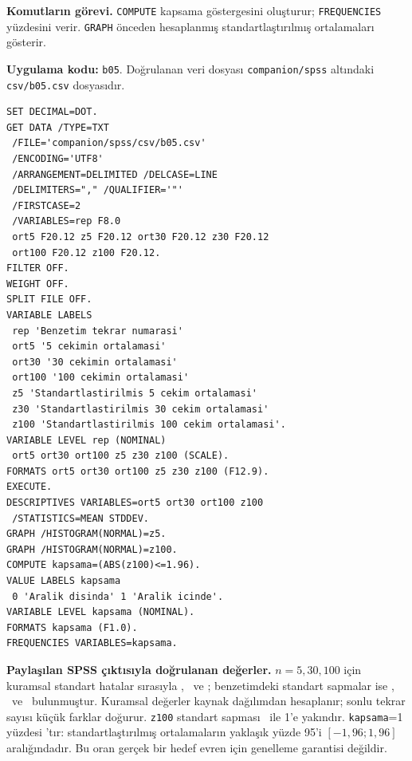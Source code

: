 {\raggedright
\noindent\textbf{Komutların görevi.} \texttt{COMPUTE} kapsama göstergesini oluşturur; \texttt{FREQUENCIES} yüzdesini verir. \texttt{GRAPH} önceden hesaplanmış standartlaştırılmış ortalamaları gösterir.\par}

\textbf{Uygulama kodu:} \texttt{b05}. Doğrulanan veri dosyası
\texttt{companion/spss} altındaki \texttt{csv/b05.csv} dosyasıdır.

\begin{lstlisting}[style=prismSPSS]
SET DECIMAL=DOT.
GET DATA /TYPE=TXT
 /FILE='companion/spss/csv/b05.csv'
 /ENCODING='UTF8'
 /ARRANGEMENT=DELIMITED /DELCASE=LINE
 /DELIMITERS="," /QUALIFIER='"'
 /FIRSTCASE=2
 /VARIABLES=rep F8.0
 ort5 F20.12 z5 F20.12 ort30 F20.12 z30 F20.12
 ort100 F20.12 z100 F20.12.
FILTER OFF.
WEIGHT OFF.
SPLIT FILE OFF.
VARIABLE LABELS
 rep 'Benzetim tekrar numarasi'
 ort5 '5 cekimin ortalamasi'
 ort30 '30 cekimin ortalamasi'
 ort100 '100 cekimin ortalamasi'
 z5 'Standartlastirilmis 5 cekim ortalamasi'
 z30 'Standartlastirilmis 30 cekim ortalamasi'
 z100 'Standartlastirilmis 100 cekim ortalamasi'.
VARIABLE LEVEL rep (NOMINAL)
 ort5 ort30 ort100 z5 z30 z100 (SCALE).
FORMATS ort5 ort30 ort100 z5 z30 z100 (F12.9).
EXECUTE.
DESCRIPTIVES VARIABLES=ort5 ort30 ort100 z100
 /STATISTICS=MEAN STDDEV.
GRAPH /HISTOGRAM(NORMAL)=z5.
GRAPH /HISTOGRAM(NORMAL)=z100.
COMPUTE kapsama=(ABS(z100)<=1.96).
VALUE LABELS kapsama
 0 'Aralik disinda' 1 'Aralik icinde'.
VARIABLE LEVEL kapsama (NOMINAL).
FORMATS kapsama (F1.0).
FREQUENCIES VARIABLES=kapsama.
\end{lstlisting}

\begin{outputguidebox}
\textbf{Paylaşılan SPSS çıktısıyla doğrulanan değerler.}
$n=5,30,100$ için kuramsal standart hatalar sırasıyla
\SPTheoryFiveSE, \SPTheoryThirtySE\ ve \SPTheoryHundredSE;
benzetimdeki standart sapmalar ise \SPSimFiveSD, \SPSimThirtySD\ ve
\SPSimHundredSD\ bulunmuştur. Kuramsal değerler kaynak dağılımdan
hesaplanır; sonlu tekrar sayısı küçük farklar doğurur.
\texttt{z100} standart sapması \SPSimZSD\ ile 1'e yakındır.
\texttt{kapsama}=1 yüzdesi \SPSimCoverage'tır: standartlaştırılmış
ortalamaların yaklaşık yüzde 95'i $[-1{,}96;1{,}96]$ aralığındadır.
Bu oran gerçek bir hedef evren için genelleme garantisi değildir.
\end{outputguidebox}


